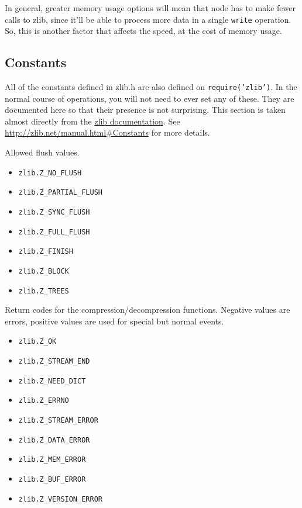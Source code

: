 In general, greater memory usage options will mean that node has to make
fewer calls to zlib, since it'll be able to process more data in a
single \texttt{write} operation. So, this is another factor that affects
the speed, at the cost of memory usage.

\subsection{Constants}\label{constants}

All of the constants defined in zlib.h are also defined on
\texttt{require('zlib')}. In the normal course of operations, you will
not need to ever set any of these. They are documented here so that
their presence is not surprising. This section is taken almost directly
from the \href{http://zlib.net/manual.html\#Constants}{zlib
documentation}. See \url{http://zlib.net/manual.html\#Constants} for
more details.

Allowed flush values.

\begin{itemize}
\itemsep1pt\parskip0pt
\item
  \texttt{zlib.Z\_NO\_FLUSH}
\item
  \texttt{zlib.Z\_PARTIAL\_FLUSH}
\item
  \texttt{zlib.Z\_SYNC\_FLUSH}
\item
  \texttt{zlib.Z\_FULL\_FLUSH}
\item
  \texttt{zlib.Z\_FINISH}
\item
  \texttt{zlib.Z\_BLOCK}
\item
  \texttt{zlib.Z\_TREES}
\end{itemize}

Return codes for the compression/decompression functions. Negative
values are errors, positive values are used for special but normal
events.

\begin{itemize}
\itemsep1pt\parskip0pt
\item
  \texttt{zlib.Z\_OK}
\item
  \texttt{zlib.Z\_STREAM\_END}
\item
  \texttt{zlib.Z\_NEED\_DICT}
\item
  \texttt{zlib.Z\_ERRNO}
\item
  \texttt{zlib.Z\_STREAM\_ERROR}
\item
  \texttt{zlib.Z\_DATA\_ERROR}
\item
  \texttt{zlib.Z\_MEM\_ERROR}
\item
  \texttt{zlib.Z\_BUF\_ERROR}
\item
  \texttt{zlib.Z\_VERSION\_ERROR}
\end{itemize}

